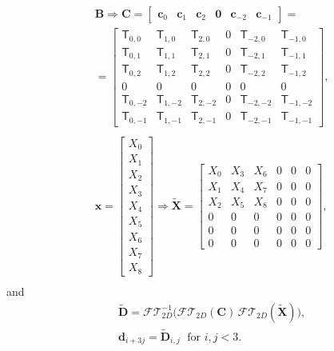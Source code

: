 \documentclass[
pra%
,preprint%
,amssymb, nobibnotes, aps, superscriptaddress, floatfix]{revtex4}
\begin{document}
\begin{align}
&\mathbf{B} \Rightarrow
\mathbf{C} = 
\begin{bmatrix}
\mathbf{c}_{0} & \mathbf{c}_{1} & \mathbf{c}_{2} & \mathbf{0} & \mathbf{c}_{-2} & \mathbf{c}_{-1}
\end{bmatrix}
= \nonumber \\
& =\begin{bmatrix}
\mathsf{T}_{0, 0} & \mathsf{T}_{1, 0} & \mathsf{T}_{2, 0} & 0 & \mathsf{T}_{-2, 0} & \mathsf{T}_{-1, 0} \\
\mathsf{T}_{0, 1} & \mathsf{T}_{1, 1} & \mathsf{T}_{2, 1} & 0 & \mathsf{T}_{-2, 1} & \mathsf{T}_{-1, 1} \\
\mathsf{T}_{0, 2} & \mathsf{T}_{1, 2} & \mathsf{T}_{2, 2} & 0 & \mathsf{T}_{-2, 2} & \mathsf{T}_{-1, 2} \\
0 & 0 & 0 & 0 & 0 & 0 \\
\mathsf{T}_{0, -2} & \mathsf{T}_{1, -2} & \mathsf{T}_{2, -2} & 0 & \mathsf{T}_{-2, -2} & \mathsf{T}_{-1, -2} \\
\mathsf{T}_{0, -1} & \mathsf{T}_{1, -1} & \mathsf{T}_{2, -1} & 0 & \mathsf{T}_{-2, -1} & \mathsf{T}_{-1, -1} 
\end{bmatrix}, \nonumber \\ \nonumber \\
&\mathbf{x}=
\begin{bmatrix}
X_{0} \\ X_{1} \\ X_{2} \\ X_{3} \\ X_{4} \\
X_{5} \\ X_{6} \\ X_{7} \\ X_{8} 
\end{bmatrix}
\Rightarrow
\mathbf{\tilde{X}}=
\begin{bmatrix}
X_{0} & X_{3} & X_{6} & 0 & 0 & 0 \\
X_{1} & X_{4} & X_{7} & 0 & 0 & 0 \\
X_{2} & X_{5} & X_{8} & 0 & 0 & 0 \\
0 & 0 & 0 & 0 & 0 & 0 \\
0 & 0 & 0 & 0 & 0 & 0 \\
0 & 0 & 0 & 0 & 0 & 0 
\end{bmatrix}, \nonumber \\ \nonumber
\end{align}
and
\begin{align}
&\mathbf{\tilde{D}} = \mathcal{FT}^{-1}_{2D}\Big(  \mathcal{FT}_{2D}(\mathbf{C}) \, \mathcal{FT}_{2D}(\mathbf{\tilde{X}}) \Big), \nonumber \\
& \mathbf{d}_{i+3j} = \mathbf{\tilde{D}}_{i,j} \; \text{ for } i,j < 3. 
\end{align}
\end{document}
